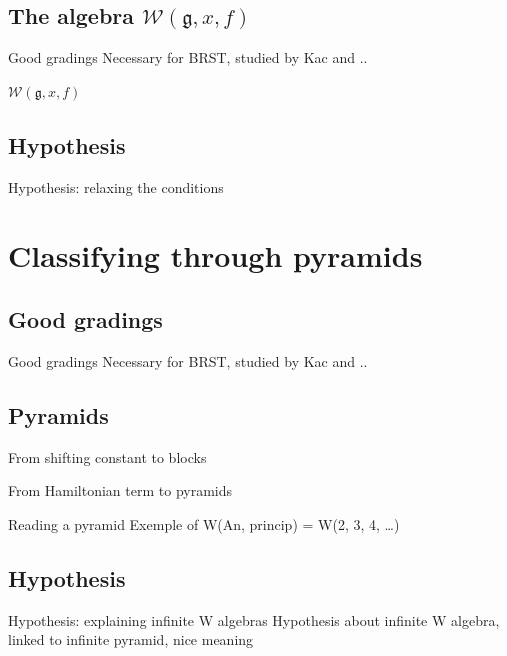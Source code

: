 \documentclass{beamer}
\begin{document}
\subsection{The algebra $\mathcal{W}(\mathfrak{g}, x, f)$}


\begin{frame}{Good gradings}
    Necessary for BRST, studied by Kac and ..
\end{frame}

\begin{frame}{$\mathcal{W}(\mathfrak{g}, x, f)$}
    
\end{frame}


\subsection{Hypothesis}


\begin{frame}{Hypothesis: relaxing the conditions}

\end{frame}



\section{Classifying through pyramids}
\subsection{Good gradings}


\begin{frame}{Good gradings}
    Necessary for BRST, studied by Kac and ..
\end{frame}


\subsection{Pyramids}


\begin{frame}{From shifting constant to blocks}
    
\end{frame}

\begin{frame}{From Hamiltonian term to pyramids}
    
\end{frame}

\begin{frame}{Reading a pyramid}
    Exemple of W(An, princip) = W(2, 3, 4, \dots)
\end{frame}


\subsection{Hypothesis}


\begin{frame}{Hypothesis: explaining infinite W algebras}
    Hypothesis about infinite W algebra, linked to infinite pyramid, nice meaning
\end{frame}
\end{document}
